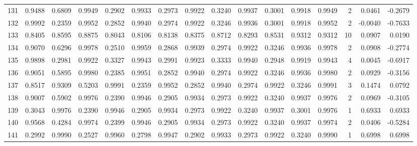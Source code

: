 \begin{tabular}{lrrrrrrrrrrrrrrr}
131 &      0.9488 &  0.6809 &  0.9949 &  0.2902 &  0.9933 &  0.2973 &  0.9922 &  0.3240 &  0.9937 &  0.3001 &   0.9918 &     0.9949 &      2 &                    0.0461 &                    -0.2679 \\
132 &      0.9992 &  0.2359 &  0.9952 &  0.2852 &  0.9940 &  0.2974 &  0.9922 &  0.3246 &  0.9936 &  0.3001 &   0.9918 &     0.9952 &      2 &                   -0.0040 &                    -0.7633 \\
133 &      0.8405 &  0.8595 &  0.8875 &  0.8043 &  0.8106 &  0.8138 &  0.8375 &  0.8712 &  0.8293 &  0.8531 &   0.9312 &     0.9312 &     10 &                    0.0907 &                     0.0190 \\
134 &      0.9070 &  0.6296 &  0.9978 &  0.2510 &  0.9959 &  0.2868 &  0.9939 &  0.2974 &  0.9922 &  0.3246 &   0.9936 &     0.9978 &      2 &                    0.0908 &                    -0.2774 \\
135 &      0.9898 &  0.2981 &  0.9922 &  0.3327 &  0.9943 &  0.2991 &  0.9923 &  0.3333 &  0.9940 &  0.2948 &   0.9919 &     0.9943 &      4 &                    0.0045 &                    -0.6917 \\
136 &      0.9051 &  0.5895 &  0.9980 &  0.2385 &  0.9951 &  0.2852 &  0.9940 &  0.2974 &  0.9922 &  0.3246 &   0.9936 &     0.9980 &      2 &                    0.0929 &                    -0.3156 \\
137 &      0.8517 &  0.9309 &  0.5203 &  0.9991 &  0.2359 &  0.9952 &  0.2852 &  0.9940 &  0.2974 &  0.9922 &   0.3246 &     0.9991 &      3 &                    0.1474 &                     0.0792 \\
138 &      0.9007 &  0.5902 &  0.9976 &  0.2390 &  0.9946 &  0.2905 &  0.9934 &  0.2973 &  0.9922 &  0.3240 &   0.9937 &     0.9976 &      2 &                    0.0969 &                    -0.3105 \\
139 &      0.3043 &  0.9976 &  0.2390 &  0.9946 &  0.2905 &  0.9934 &  0.2973 &  0.9922 &  0.3240 &  0.9937 &   0.3001 &     0.9976 &      1 &                    0.6933 &                     0.6933 \\
140 &      0.9568 &  0.4284 &  0.9974 &  0.2399 &  0.9946 &  0.2905 &  0.9934 &  0.2973 &  0.9922 &  0.3240 &   0.9937 &     0.9974 &      2 &                    0.0406 &                    -0.5284 \\
141 &      0.2992 &  0.9990 &  0.2527 &  0.9960 &  0.2798 &  0.9947 &  0.2902 &  0.9933 &  0.2973 &  0.9922 &   0.3240 &     0.9990 &      1 &                    0.6998 &                     0.6998 \\

\end{tabular}
